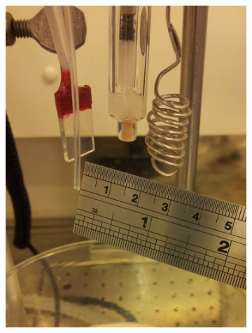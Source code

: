 \documentclass[webedition,openright,titles,swedish,english]{LuaUUThesis}\usepackage[]{graphicx}\usepackage[]{xcolor}
\begin{document}
\begin{figure}[tbp]
\begin{subfigure}[b]{0.25\linewidth}
   \includegraphics[width=\textwidth]{synthesis/electrodeposition/autolab-cell-electrodes-distance_0508130452-cropped.jpg}
   \caption{}
   \label{fig:0301-ED-electrodes-distance}
\end{subfigure}%
\hspace{7pt}%
\begin{subfigure}[b]{0.25\linewidth}
   \centering

\end{subfigure}
\end{figure}
\end{document}
